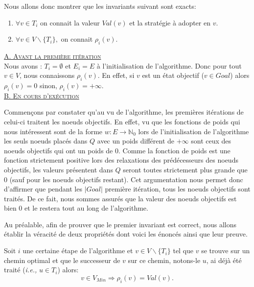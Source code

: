 $\text{}$\\
\noindent Nous allons donc montrer que les invariants suivant sont exacts: 

\begin{enumerate}
	\item $\forall v \in T_i$ on connait la valeur $Val(v)$ et la stratégie à adopter en $v$.
	\item $\forall v \in V \backslash \{ T_i \},$ on connait $\rho_i(v)$.
\end{enumerate}
	
\noindent \underline{\textsc{A. Avant la première itération}}\\

Nous avons : $T_i = \emptyset$ et $E_i = E$ à l'initialisation de l'algorithme. Donc pour tout $v \in V$, nous connaissons $\rho_i(v)$. En effet, si $v$ est un état objectif ($v \in Goal$) alors $\rho_i(v) = 0$ sinon, $\rho_i(v) = + \infty$.\\

\noindent \underline{\textsc{B. En cours d'exécution}}\\

Commençons par constater qu'au vu de l'algorithme, les premières itérations de celui-ci traitent les noeuds objectifs. En effet, vu que les fonctions de poids qui nous intéressent sont de la forme $w: E \rightarrow \mathbb{N}_{0}$ lors de l'initialisation de l'algorithme les seuls noeuds placés dans $Q$ avec un poids différent de $ + \infty$ sont ceux des noeuds objectifs qui ont un poids de 0. Comme la fonction de poids est une fonction strictement positive lors des relaxations des prédécesseurs des noeuds objectifs, les valeurs présentent dans $Q$ seront toutes strictement plus grande que 0 (sauf pour les noeuds objectifs restant). Cet argumentation nous permet donc d'affirmer que pendant les $|Goal|$ première itération, tous les noeuds objectifs sont traités. De ce fait, nous sommes assurés que la valeur des noeuds objectifs est bien 0 et le restera tout au long de l'algorithme.

Au préalable, afin de prouver que le premier invariant est correct, nous allons établir la véracité de deux propriétés dont voici les énoncés ainsi que leur preuve.
\setcounter{equation}{0}

\begin{propriete}
	\label{prop:dijk1}
	Soit $i$ une certaine étape de l'algorithme et $v \in V\backslash \{ T_i \}$ tel que $v$ se trouve sur un chemin optimal et que le successeur de $v$ sur ce chemin, notons-le $u$, ai déjà été traité (\emph{i.e.,} $u \in T_i$) alors:
	$$ v \in V_{Min} \Rightarrow \rho_i(v) = Val(v).$$
\end{propriete}

